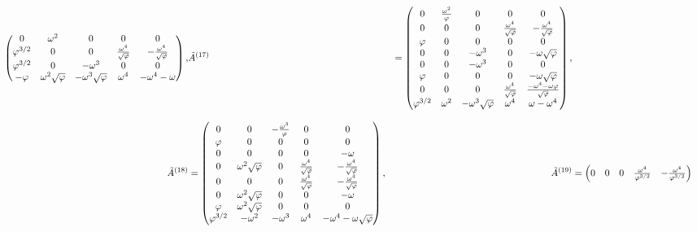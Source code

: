 \begin{align}
\begin{pmatrix}
    0 & \omega^2 & 0 & 0 & 0 \\
    \varphi^{3/2} & 0 & 0 & \frac{\omega^4}{\sqrt{\varphi}} & -\frac{\omega^4}{\sqrt{\varphi}} \\
    \varphi^{3/2} & 0 & -\omega^3 & 0 & 0 \\
    -\varphi & \omega^2 \sqrt{\varphi} & -\omega^3\sqrt{\varphi} & \omega^4 & -\omega^4-\omega \\
  \end{pmatrix}, &
  \tilde{A}^{(17)} &= \begin{pmatrix}
    0 & \frac{\omega^2}{\varphi} & 0 & 0 & 0 \\
    0 & 0 & 0 & \frac{\omega^4}{\sqrt{\varphi}} & -\frac{\omega^4}{\sqrt{\varphi}} \\
    \varphi & 0 & 0 & 0 & 0 \\
    0 & 0 & -\omega^3 & 0 & -\omega\sqrt{\varphi} \\
    0 & 0 & -\omega^3 & 0 & 0 \\
    \varphi & 0 & 0 & 0 & -\omega\sqrt{\varphi} \\
    0 & 0 & 0 & \frac{\omega^4}{\sqrt{\varphi}} & \frac{-\omega^4-\omega \varphi}{\sqrt{\varphi}} \\
    \varphi^{3/2} & \omega^2 & -\omega^3\sqrt{\varphi} & \omega^4 & \omega-\omega^4 \\
  \end{pmatrix}, \notag \\[2ex]
  \tilde{A}^{(18)} &= \begin{pmatrix}
    0 & 0 & -\frac{\omega^3}{\varphi} & 0 & 0 \\
    \varphi & 0 & 0 & 0 & 0 \\
    0 & 0 & 0 & 0 & -\omega \\
    0 & \omega^2 \sqrt{\varphi} & 0 & \frac{\omega^4}{\sqrt{\varphi}} & -\frac{\omega^4}{\sqrt{\varphi}} \\
    0 & 0 & 0 & \frac{\omega^4}{\sqrt{\varphi}} & -\frac{\omega^4}{\sqrt{\varphi}} \\
    0 & \omega^2 \sqrt{\varphi} & 0 & 0 & -\omega \\
    \varphi & \omega^2 \sqrt{\varphi} & 0 & 0 & 0 \\
    \varphi^{3/2} & -\omega^2 & -\omega^3 & \omega^4 & -\omega^4-\omega \sqrt{\varphi} \\
  \end{pmatrix}, &
  \tilde{A}^{(19)} &= \begin{pmatrix}
    0 & 0 & 0 & \frac{\omega^4}{\varphi^{3/2}} & -\frac{\omega^4}{\varphi^{3/2}} \\

\end{pmatrix}
\end{align}
